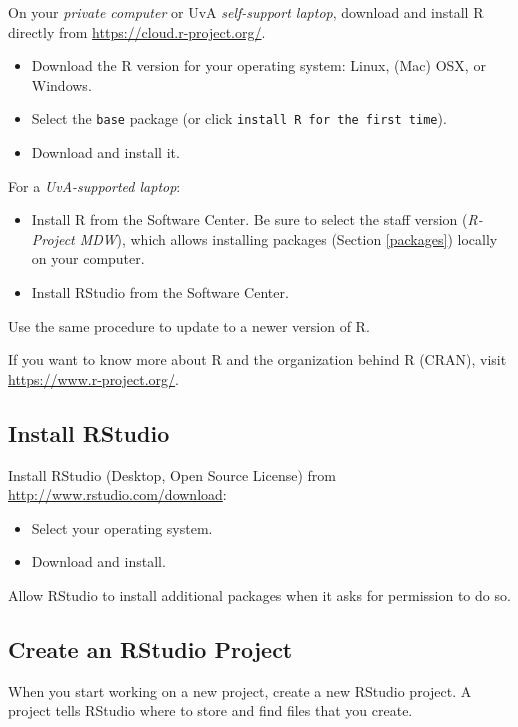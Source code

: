 \documentclass[doc,floatsintext]{apa6}
\providecommand{\tightlist}{%
  \setlength{\itemsep}{0pt}\setlength{\parskip}{0pt}}
\begin{document}
On your \emph{private computer} or UvA \emph{self-support laptop},
download and install R directly from \url{https://cloud.r-project.org/}.

\begin{itemize}
\tightlist
\item
  Download the R version for your operating system: Linux, (Mac) OSX, or
  Windows.
\item
  Select the \texttt{base} package (or click
  \texttt{install\ R\ for\ the\ first\ time}).
\item
  Download and install it.
\end{itemize}

For a \emph{UvA-supported laptop}:

\begin{itemize}
\tightlist
\item
  Install R from the Software Center. Be sure to select the staff
  version (\emph{R-Project MDW}), which allows installing packages
  (Section \ref{packages}) locally on your computer.
\item
  Install RStudio from the Software Center.
\end{itemize}

Use the same procedure to update to a newer version of R.

If you want to know more about R and the organization behind R (CRAN),
visit \url{https://www.r-project.org/}.

\subsection{Install RStudio}\label{install-rstudio}

Install RStudio (Desktop, Open Source License) from
\url{http://www.rstudio.com/download}:

\begin{itemize}
\tightlist
\item
  Select your operating system.
\item
  Download and install.
\end{itemize}

Allow RStudio to install additional packages when it asks for permission
to do so.

\subsection{Create an RStudio Project}\label{create-an-rstudio-project}

When you start working on a new project, create a new RStudio project. A
project tells RStudio where to store and find files that you create.
\end{document}
